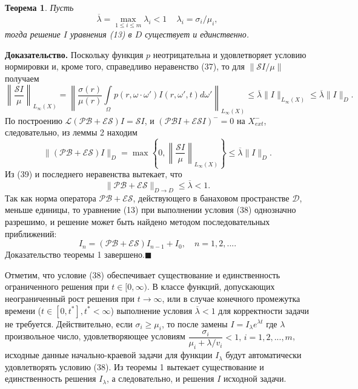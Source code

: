 \documentclass[12pt,reqno]{report}
\newtheorem{theorem}{Теорема}
\begin{document}
\begin{theorem}
	Пусть
	\begin{equation}
	\overline{\lambda} = \max \limits_{1\leq i\leq m} \lambda_i
	<1\,\quad \lambda_i = \sigma_i/\mu_i,
	\end{equation}
	тогда решение $I$ уравнения (13) в $D$ существует и единственно.
\end{theorem}
{\bf Доказательство.} Поскольку функция $p$ неотрицательна и
удовлетворяет условию нормировки и, кроме того, справедливо
неравенство (37), то для $\|\mathcal S I/\mu \|$ получаем
\begin{equation}
\left\|\frac{\mathcal S I}{\mu} \right \|_{L_{\infty}(X)}= \left\|\frac{
	\sigma(r)}{\mu(r)} \int \limits_{\Omega} p(r,\omega \cdot \omega')
I(r,\omega',t)d\omega' \right \|_{L_{\infty}(X)} \leq \overline{\lambda}\|I\|_{L_{\infty}(X)}
\leq \overline{\lambda} \|I\|_{D}.
\end{equation}
По построению $\mathcal L (\mathcal P \mathcal B + \mathcal E
\mathcal S) I = \mathcal S I$, и $(\mathcal P \mathcal B I +
\mathcal E \mathcal S I)^- =0$ на $X^-_{ext}$, следовательно, из
леммы 2 находим
$$
\|(\mathcal P \mathcal B + \mathcal E \mathcal S) I\|_{D} = \max
\left\{ 0, \left \| \frac{\mathcal S I}{\mu} \right \|_{L_{\infty}(X)}
\right\} \leq \overline{\lambda} \|I\|_{D}.
$$
Из (39) и последнего неравенства вытекает, что
$$
\|\mathcal P \mathcal B + \mathcal E \mathcal S\|_{D \to D} \leq
\overline{\lambda} <1.
$$
Так как норма оператора $\mathcal P \mathcal B + \mathcal E
\mathcal S$, действующего в банаховом пространстве $\mathcal{D}$,
меньше единицы, то уравнение (13) при выполнении условия (38)
однозначно разрешимо, и решение может быть найдено методом
последовательных приближений:
$$
I_n =(\mathcal P \mathcal B + \mathcal E \mathcal S)I_{n-1} +I_0,
\quad n=1,2,....
$$
Доказательство теоремы 1 завершено.$\blacksquare$

Отметим, что условие (38) обеспечивает существование и
единственность ограниченного решения при $t \in [0,\infty)$. В 
классе функций, допускающих неограниченный рост решения при $t
\to \infty$, или в случае конечного промежутка времени ($t\in [0,t^*], t^* <
\infty $) выполнение условия $\overline{\lambda}<1$ для корректности задачи 
не требуется.  Действительно, если $\sigma_i \geq \mu_i$, то после замены $I= I_{\lambda} e^{\lambda t}$
где $\lambda$ произвольное число, удовлетворяющее условиям
$\dfrac{\sigma_i}{\mu_i +\lambda/v_i} < 1,\, i=1,2,...,m$,
исходные данные начально-краевой задачи для функции $I_{\lambda}$
будут автоматически удовлетворять условию (38). Из теоремы 1 вытекает
существование и единственность решения $I_{\lambda}$, а
следовательно, и решения $I$ исходной задачи. 
\end{document}
